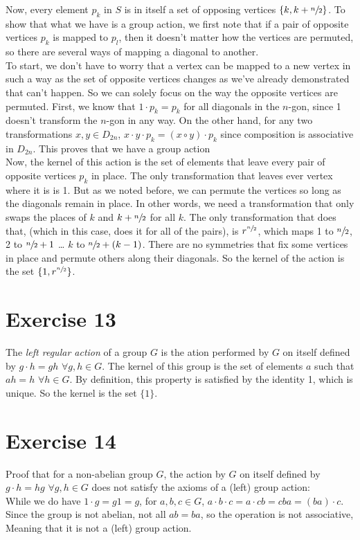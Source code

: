 \documentclass{article}
\begin{document}
    Now, every element $p_k$ in $S$ is in itself a set of opposing
    vertices $\{k, k + \sfrac{n}{2}\}$.
    To show that what we have is a group action,
    we first note that if a pair of opposite vertices $p_k$
    is mapped to $p_l$,
    then it doesn't matter how the vertices are permuted,
    so there are several ways of mapping a diagonal to another. \\
    To start, we don't have to worry that a vertex can
    be mapped to a new vertex in such a way as the set of opposite
    vertices changes
    as we've already demonstrated that can't happen.
    So we can solely focus on the way the opposite vertices are permuted.
    First, we know that $1 \cdot p_k = p_k$ for all diagonals in
    the $n$-gon,
    since 1 doesn't transform the $n$-gon in any way.
    On the other hand, for any two transformations $x, y \in D_{2n}$,
    $x \cdot y \cdot p_k =  (x \circ y) \cdot p_k$
    since composition is associative in $D_{2n}$.
    This proves that we have a group action\\
    Now, the kernel of this action is the set of elements that
    leave every pair of opposite vertices $p_k$ in place.
    The only transformation that leaves ever vertex where it is is 1.
    But as we noted before,
    we can permute the vertices so long as the diagonals remain in place.
    In other words, we need a transformation that only swaps the places
    of $k$ and $k + \sfrac{n}{2}$ for all $k$.
    The only transformation that does that,
    (which in this case, does it for all of the pairs),
    is $r^{\sfrac{n}{2}}$,
    which maps 1 to $\sfrac{n}{2}$, 2 to $\sfrac{n}{2} + 1$ \dots
    $k$ to $\sfrac{n}{2} + (k-1)$.
    There are no symmetries that fix some vertices in place
    and permute others along their diagonals.
    So the kernel of the action is the set $\{1, r^{\sfrac{n}{2}}\}$.


    \section*{Exercise 13}
    The \textit{left regular action} of a group $G$
    is the ation performed by $G$ on itself defined by
    $g \cdot h = gh$ $\forall g, h \in G$.
    The kernel of this group is the set of elements $a$
    such that $ah = h$ $\forall h \in G$.
    By definition, this property is satisfied by the identity 1,
    which is unique.
    So the kernel is the set $\{1\}$.

    
    \section*{Exercise 14}
    Proof that for a non-abelian group $G$, the action by $G$ on itself
    defined by $g \cdot h = hg$ $\forall g, h \in G$
    does not satisfy the axioms of a (left) group action: \\
    While we do have $1 \cdot g = g1 = g$,
    for $a, b, c \in G$,
    $a \cdot b \cdot c = a \cdot cb = cba = (ba) \cdot c$.
    Since the group is not abelian, not all $ab = ba$,
    so the operation is not associative,
    Meaning that it is not a (left) group action.
\end{document}
